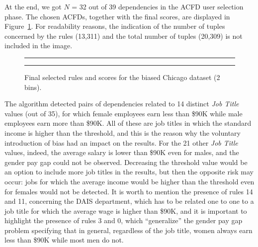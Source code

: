 \begin{itemize}
At the end, we got \(N\) = 32 out of 39 dependencies in the ACFD user selection phase. The chosen ACFDs, together with the final scores, are displayed in Figure~\ref{fig:chicago_biased_fair-db}. For readability reasons, the indication of the number of tuples concerned by the rules (13,311) and the total number of tuples (20,309) is not included in the image.

\begin{figure}[t!]
\centering
\noindent\rule{\linewidth}{0.4pt}\par
\end{figure}
\begin{figure}[t!]
\ContinuedFloat
\centering
\noindent\rule{\linewidth}{0.4pt}
\caption{Final selected rules and scores for the biased Chicago dataset (2 bins).}
\label{fig:chicago_biased_fair-db}
\end{figure}

The algorithm detected pairs of dependencies related to 14 distinct \textit{Job Title} values (out of 35), for which female employees earn less than \$90K while male employees earn more than \$90K. All of these are job titles in which the standard income is higher than the threshold, and this is the reason why the voluntary introduction of bias had an impact on the results. For the 21 other \textit{Job Title} values, indeed, the average salary is lower than \$90K even for males, and the gender pay gap could not be observed. Decreasing the threshold value would be an option to include more job titles in the results, but then the opposite risk may occur: jobs for which the average income would be higher than the threshold even for females would not be detected. It is worth to mention the presence of rules 14 and 11, concerning the DAIS department, which has to be related one to one to a job title for which the average wage is higher than \$90K, and it is important to highlight the presence of rules 3 and 0, which ``generalize'' the gender pay gap problem specifying that in general, regardless of the job title, women always earn less than \$90K while most men do not.


\end{itemize}

